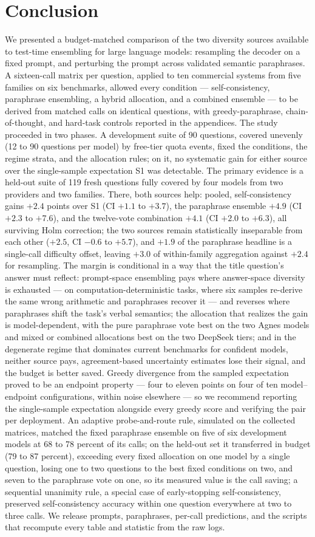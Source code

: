 \section{Conclusion}
\label{sec:conclusion}

We presented a budget-matched comparison of the two diversity sources available to test-time ensembling for large language models: resampling the decoder on a fixed prompt, and perturbing the prompt across validated semantic paraphrases. A sixteen-call matrix per question, applied to ten commercial systems from five families on six benchmarks, allowed every condition --- self-consistency, paraphrase ensembling, a hybrid allocation, and a combined ensemble --- to be derived from matched calls on identical questions, with greedy-paraphrase, chain-of-thought, and hard-task controls reported in the appendices. The study proceeded in two phases. A development suite of 90 questions, covered unevenly (12 to 90 questions per model) by free-tier quota events, fixed the conditions, the regime strata, and the allocation rules; on it, no systematic gain for either source over the single-sample expectation S1 was detectable. The primary evidence is a held-out suite of 119 fresh questions fully covered by four models from two providers and two families. There, both sources help: pooled, self-consistency gains $+2.4$ points over S1 (CI $+1.1$ to $+3.7$), the paraphrase ensemble $+4.9$ (CI $+2.3$ to $+$7.6), and the twelve-vote combination $+4.1$ (CI $+2.0$ to $+6.3$), all surviving Holm correction; the two sources remain statistically inseparable from each other ($+2.5$, CI $-$0.6 to $+5.7$), and $+1.9$ of the paraphrase headline is a single-call difficulty offset, leaving $+3.0$ of within-family aggregation against $+2.4$ for resampling. The margin is conditional in a way that the title question's answer must reflect: prompt-space ensembling pays where answer-space diversity is exhausted --- on computation-deterministic tasks, where six samples re-derive the same wrong arithmetic and paraphrases recover it --- and reverses where paraphrases shift the task's verbal semantics; the allocation that realizes the gain is model-dependent, with the pure paraphrase vote best on the two Agnes models and mixed or combined allocations best on the two DeepSeek tiers; and in the degenerate regime that dominates current benchmarks for confident models, neither source pays, agreement-based uncertainty estimates lose their signal, and the budget is better saved. Greedy divergence from the sampled expectation proved to be an endpoint property --- four to eleven points on four of ten model--endpoint configurations, within noise elsewhere --- so we recommend reporting the single-sample expectation alongside every greedy score and verifying the pair per deployment. An adaptive probe-and-route rule, simulated on the collected matrices, matched the fixed paraphrase ensemble on five of six development models at 68 to 78 percent of its calls; on the held-out set it transferred in budget (79 to 87 percent), exceeding every fixed allocation on one model by a single question, losing one to two questions to the best fixed conditions on two, and seven to the paraphrase vote on one, so its measured value is the call saving; a sequential unanimity rule, a special case of early-stopping self-consistency, preserved self-consistency accuracy within one question everywhere at two to three calls. We release prompts, paraphrases, per-call predictions, and the scripts that recompute every table and statistic from the raw logs.
